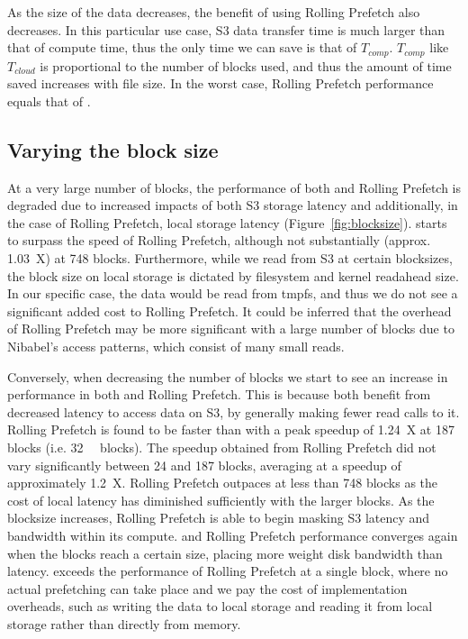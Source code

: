 \documentclass[conference]{IEEEtran}
\begin{document}
As the size of the data decreases, the benefit of using Rolling Prefetch also decreases. 
In this particular use case, S3 data transfer time is much larger
than that of compute time, thus the only time we can save is that of $T_{comp}$. $T_{comp}$ like ${T_{cloud}}$ is
proportional to the number of blocks used, and thus the amount of time saved increases with file size. In the 
worst case, Rolling Prefetch performance equals that of \sfs.

\subsection{Varying the block size}%

At a very large number of blocks, the performance of both \sfs and Rolling Prefetch is degraded due to
increased impacts of both S3 storage latency and additionally, in the case of Rolling Prefetch, local storage latency (Figure~\ref{fig:blocksize}).  \sfs starts to surpass the speed of Rolling Prefetch, although not substantially (approx. 1.03~X) at 748 blocks.  Furthermore, while we read from S3
at certain blocksizes, the block size on local storage is dictated by filesystem and kernel readahead 
size. In our specific case, the data would be read from tmpfs, and thus we do not see a significant added cost
to Rolling Prefetch. It could be inferred that the overhead of Rolling Prefetch may be more significant with a large
number of blocks due to Nibabel's access patterns, which consist of many small reads.

Conversely, when decreasing the number of blocks we start to see an increase in performance in both \sfs and Rolling Prefetch. This
is because both benefit from decreased latency to access data on S3, by generally making fewer read calls to it. Rolling Prefetch is found to be faster than \sfs with a peak speedup of 1.24~X at 187 blocks (i.e. 
\SI{32}{\mebi\byte} blocks). The speedup obtained from Rolling Prefetch did not vary significantly between 24 and
187 blocks, averaging at a speedup of approximately 1.2~X. Rolling Prefetch outpaces \sfs at less than
748 blocks as the cost of local latency has diminished sufficiently with the larger blocks. As the blocksize
increases, Rolling Prefetch is able to begin masking S3 latency and bandwidth within its compute.
\sfs and Rolling Prefetch performance converges again when the blocks reach a certain size, placing more weight disk bandwidth
than latency. \sfs exceeds the performance of Rolling Prefetch at a single block, where no actual prefetching can take
place and we pay the cost of implementation overheads, such as writing the data to local storage 
and reading it from local storage rather than directly from memory.
\end{document}
